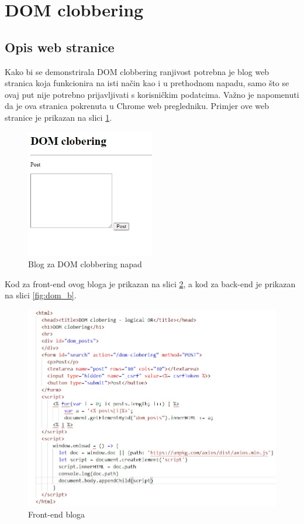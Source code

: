 \documentclass[12pt, oneside, onecolumn]{book}
\begin{document}
{\section{DOM clobbering}
\subsection{Opis web stranice}
Kako bi se demonstrirala DOM clobbering ranjivost potrebna je blog web stranica koja funkcionira na isti način kao i u prethodnom napadu, samo što se ovaj put nije potrebno prijavljivati s korisničkim podatcima. Važno je napomenuti da je ova stranica pokrenuta u Chrome web pregledniku. Primjer ove web stranice je prikazan na slici \ref{fig:dom}.

\begin{figure}[H]
	\begin{center}
		\includegraphics[width=0.5\textwidth]{dom.jpg}
		\caption{Blog za DOM clobbering napad} \label{fig:dom}
	\end{center}
\end{figure}

Kod za front-end ovog bloga je prikazan na slici \ref{fig:dom_f}, a kod za back-end je prikazan na slici \ref{fig:dom_b}.

\begin{figure}[H]
	\begin{center}
		\includegraphics[width=\textwidth]{dom_f.jpg}
		\caption{Front-end bloga} \label{fig:dom_f}
	\end{center}
\end{figure}

}
\end{document}
